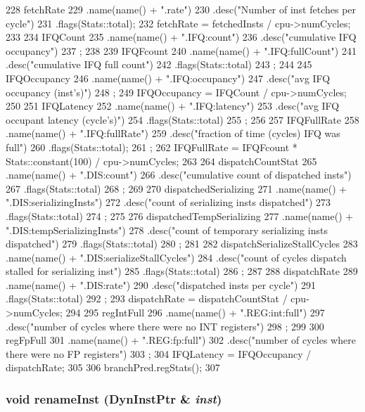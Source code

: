 \begin{DoxyCode}
{228     fetchRate
229         .name(name() + ".rate")
230         .desc("Number of inst fetches per cycle")
231         .flags(Stats::total);
232     fetchRate = fetchedInsts / cpu->numCycles;
233 
234     IFQCount
235         .name(name() + ".IFQ:count")
236         .desc("cumulative IFQ occupancy")
237         ;
238 
239     IFQFcount
240         .name(name() + ".IFQ:fullCount")
241         .desc("cumulative IFQ full count")
242         .flags(Stats::total)
243         ;
244 
245     IFQOccupancy
246         .name(name() + ".IFQ:occupancy")
247         .desc("avg IFQ occupancy (inst's)")
248         ;
249     IFQOccupancy = IFQCount / cpu->numCycles;
250 
251     IFQLatency
252         .name(name() + ".IFQ:latency")
253         .desc("avg IFQ occupant latency (cycle's)")
254         .flags(Stats::total)
255         ;
256 
257     IFQFullRate
258         .name(name() + ".IFQ:fullRate")
259         .desc("fraction of time (cycles) IFQ was full")
260         .flags(Stats::total);
261         ;
262     IFQFullRate = IFQFcount * Stats::constant(100) / cpu->numCycles;
263 
264     dispatchCountStat
265         .name(name() + ".DIS:count")
266         .desc("cumulative count of dispatched insts")
267         .flags(Stats::total)
268         ;
269 
270     dispatchedSerializing
271         .name(name() + ".DIS:serializingInsts")
272         .desc("count of serializing insts dispatched")
273         .flags(Stats::total)
274         ;
275 
276     dispatchedTempSerializing
277         .name(name() + ".DIS:tempSerializingInsts")
278         .desc("count of temporary serializing insts dispatched")
279         .flags(Stats::total)
280         ;
281 
282     dispatchSerializeStallCycles
283         .name(name() + ".DIS:serializeStallCycles")
284         .desc("count of cycles dispatch stalled for serializing inst")
285         .flags(Stats::total)
286         ;
287 
288     dispatchRate
289         .name(name() + ".DIS:rate")
290         .desc("dispatched insts per cycle")
291         .flags(Stats::total)
292         ;
293     dispatchRate = dispatchCountStat / cpu->numCycles;
294 
295     regIntFull
296         .name(name() + ".REG:int:full")
297         .desc("number of cycles where there were no INT registers")
298         ;
299 
300     regFpFull
301         .name(name() + ".REG:fp:full")
302         .desc("number of cycles where there were no FP registers")
303         ;
304     IFQLatency = IFQOccupancy / dispatchRate;
305 
306     branchPred.regStats();
307 }
\end{DoxyCode}
\hypertarget{classFrontEnd_a837fe0c15d6fe36620f73f1b81558d56}{
\subsubsection[{renameInst}]{\setlength{\rightskip}{0pt plus 5cm}void renameInst ({\bf DynInstPtr} \& {\em inst})}}
\label{classFrontEnd_a837fe0c15d6fe36620f73f1b81558d56}



